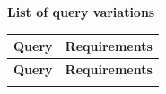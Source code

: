 \documentclass[12pt,a4paper,oneside]{article}
\begin{document}



\begin{flushleft}
\textbf{List of query variations}
\end{flushleft}

\begin{center}
\begin{longtable}{|l|p{8cm}|}
  \hline
  \textbf{Query} & \textbf{Requirements} \\
  \hline\hline
  \endfirsthead
  \hline
  \textbf{Query} & \textbf{Requirements} \\
  \hline\hline
  \endhead
  \endlastfoot


\end{longtable}
\end{center}
\end{document}

